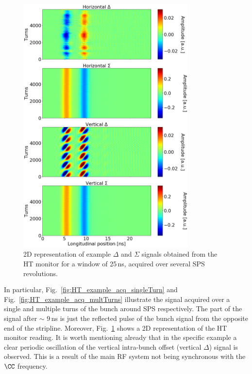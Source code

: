 \begin{figure}[!h]
   \centering         
   \includegraphics[width=0.8\textwidth]{images/Ch4/HT_2D__20180530_135105_colorbar.png}
       \caption{2D representation of example $\Delta$ and $\Sigma$ signals obtained from the HT monitor for a window of 25\,ns, acquired over several SPS revolutions.}
       \label{fig:HT_example_acq_multTurns_2D}
\end{figure}

In particular, Fig.~\ref{fig:HT_example_acq_singleTurn} and Fig.~\ref{fig:HT_example_acq_multTurns} illustrate the signal acquired over a single and multiple turns of the bunch around SPS respectively. The part of the signal after $\sim$ 9\,ns is just the reflected pulse of the bunch signal from the opposite end of the stripline. Moreover, Fig.~\ref{fig:HT_example_acq_multTurns_2D} shows a 2D representation of the HT monitor reading. It is worth mentioning already that in the specific example a clear periodic oscillation of the vertical intra-bunch offset (vertical $\Delta$) signal is observed. This is a result of the main RF system not being synchronous with the  $\CC$  frequency. 


